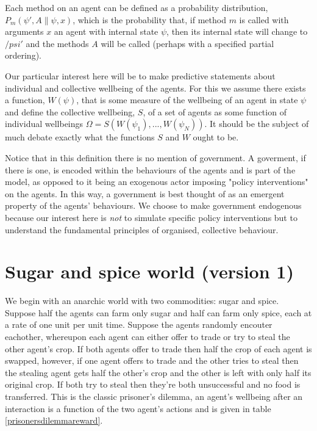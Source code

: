 \documentclass[a4paper]{report}
\begin{document}
Each method on an agent can be defined as a probability distribution, $P_m(\psi',A\|\psi,x)$, which is the probability that, if method $m$ is called with arguments $x$ an agent with internal state $\psi$, then its internal state will change to $/psi'$ and the methods $A$ will be called (perhaps with a specified partial ordering). 

Our particular interest here will be to make predictive statements about individual and collective wellbeing of the agents. For this we assume there exists a function, $W(\psi)$, that is some measure of the wellbeing of an agent in state $\psi$ and define the collective wellbeing, $S$,  of a set of agents as some function of individual wellbeings $\Omega = S( W(\psi_1), ..., W(\psi_N))$. It should be the subject of much debate exactly what the functions $S$ and $W$ ought to be.

Notice that in this definition there is no mention of government. A goverment, if there is one, is encoded within the behaviours of the agents and is part of the model, as opposed to it being an exogenous actor imposing "policy interventions" on the agents. In this way, a government is best thought of as an emergent property of the agents' behaviours. We choose to make government endogenous because our interest here is \textit{not} to simulate specific policy interventions but to understand the fundamental principles of organised, collective behaviour.

\chapter{Sugar and spice world (version 1)}

We begin with an anarchic world with two commodities: sugar and spice. Suppose half the agents can farm only sugar and half can farm only spice, each at a rate of one unit per unit time. Suppose the agents randomly encouter eachother, whereupon each agent can either offer to trade or try to steal the other agent's crop. If both agents offer to trade then half the crop of each agent is swapped, however, if one agent offers to trade and the other tries to steal then the stealing agent gets half the other's crop and the other is left with only half its original crop. If both try to steal then they're both unsuccessful and no food is transferred. This is the classic prisoner's dilemma, an agent's wellbeing after an interaction is a function of the two agent's actions and is given in table \ref{prisonersdilemmareward}.
\end{document}
